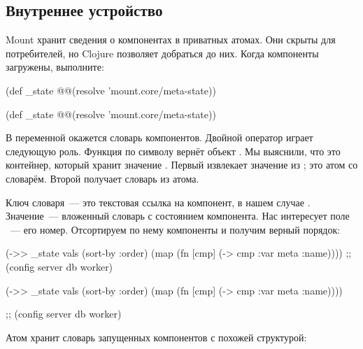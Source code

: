 \subsection{Внутреннее устройство}

Mount хранит сведения о компонентах в приватных атомах. Они скрыты для
потребителей, но Clojure позволяет добраться до них. Когда компоненты загружены,
выполните:

\ifnarrow

\begin{clojure}
(def _state
  @@(resolve 'mount.core/meta-state))
\end{clojure}

\else

\begin{clojure}
(def _state @@(resolve 'mount.core/meta-state))
\end{clojure}

\fi


В переменной  окажется словарь компонентов. Двойной оператор
 играет следующую роль. Функция  по символу вернёт
объект . Мы выяснили, что это контейнер, который хранит
значение . Первый  извлекает значение из
; это атом со словарём. Второй  получает словарь из атома.

Ключ словаря~--- это текстовая ссылка на компонент, в нашем случае
. Значение~--- вложенный словарь с
состоянием компонента. Нас интересует поле ~--- его
номер. Отсортируем по нему компоненты и получим верный порядок:

\ifafive

\begin{clojure}
(->> _state
     vals (sort-by :order)
     (map (fn [cmp]
            (-> cmp :var meta :name))))
;; (config server db worker)
\end{clojure}

\else

\begin{clojure}
(->> _state
     vals
     (sort-by :order)
     (map (fn [cmp]
            (-> cmp :var meta :name))))

;; (config server db worker)
\end{clojure}

\fi

Атом  хранит словарь запущенных компонентов с похожей структурой:

